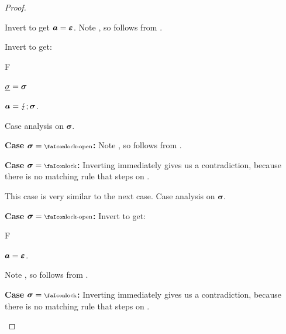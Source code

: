 \begin{proof}
\begin{description}
\begin{description}
          Invert  to get $\bm{a}=\bm{\varepsilon}$.
          Note , so  follows from .

          Invert  to get:
          \begin{passumptions}{F}
            \item $\underline{\sigma}=\bm{\sigma}$
            \item $\bm{a}=\bm{\lightning};\bm{\sigma}$.
          \end{passumptions}
          Case analysis on $\bm{\sigma}$.
          \begin{description}
            \item \textbf{Case }$\bm{\sigma}=\unlock$\textbf{:}
              Note , so  follows from .

            \item \textbf{Case }$\bm{\sigma}=\lock$\textbf{:}
              Inverting  immediately gives us a contradiction, because there is no matching rule that steps on \lock.
          \end{description}

          This case is very similar to the next case.
          Case analysis on $\bm{\sigma}$.
          \begin{description}
            \item \textbf{Case }$\bm{\sigma}=\unlock$\textbf{:}
              Invert  to get:
              \begin{passumptions}{F}
                \item $\bm{a}=\bm{\varepsilon}$.
              \end{passumptions}
              Note , so  follows from .

            \item \textbf{Case }$\bm{\sigma}=\lock$\textbf{:}
              Inverting  immediately gives us a contradiction, because there is no matching rule that steps on \lock.
          \end{description}
      \end{description}
  \end{description}
\end{proof}


